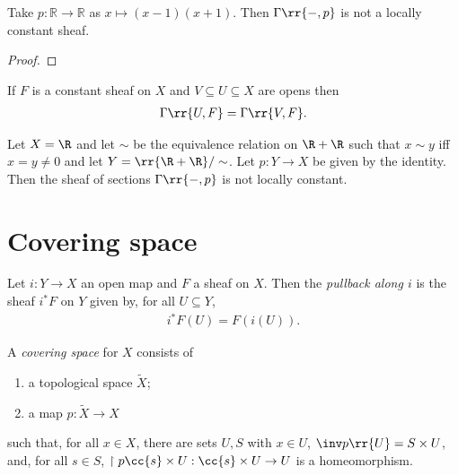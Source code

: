 \documentclass{article}
\begin{document}
\begin{nonexample}
  Take $p: \mathbb{R} \to \mathbb{R}$ as $x \mapsto (x-1)(x+1)$.
  Then $\Gamma\rr{-,p}$ is not a locally constant sheaf.
  \begin{proof}
    \missingproof
  \end{proof}
\end{nonexample}

\begin{lemma}
  If $F$ is a constant sheaf on $X$ and $V\subseteq U\subseteq X$ are opens then
  \begin{align*}
    \Gamma\rr{U, F} = \Gamma\rr{V,F}.
  \end{align*}
\end{lemma}

\begin{example}
  Let $X=\R$ and let $\sim$ be the equivalence relation on $\R+\R$ such that
  $x\sim y$ iff $x=y\neq 0$ and let $Y=\rr{\R+\R}/\sim$. Let $p:Y\to X$ be
  given by the identity. Then the sheaf of sections $\Gamma\rr{-,p}$
  is not locally constant.
\end{example}

\section{Covering space}\label{sec:covering_space}

\begin{definition}
  Let $i:Y\to X$ an open map and $F$ a sheaf on $X$. Then
  the \emph{pullback along $i$} is the sheaf $i^*F$ on $Y$
  given by, for all $U\subseteq Y$,
  \begin{align*}
    i^*F(U) = F(i(U)).
  \end{align*}
\end{definition}



\begin{definition}
  A \emph{covering space} for $X$ consists of
  \begin{enumerate}
    \item a topological space $\tilde X$;
    \item a map $p:\tilde X\to X$
  \end{enumerate}
  such that, for all $x\in X$, there are sets $U,S$ with $x\in U$, $\inv p\rr{U}=S\times U$,
  and, for all $s\in S$, $\restriction{p}{\cc{s}\times U}:\cc{s}\times U\to U$ is a
  homeomorphism.
\end{definition}
\end{document}
